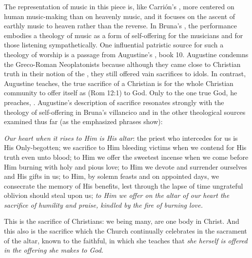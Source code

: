 The representation of music in this piece is, like Carrión's , more centered on human music-making than on heavenly music, and it focuses on the ascent of earthly music to heaven rather than the reverse.
In Bruna's , the performance embodies a theology of music as a form of self-offering for the musicians and for those listening sympathetically.
One influential patristic source for such a theology of worship is a passage from Augustine's , book 10.
Augustine condemns the Greco-Roman Neoplatonists because although they came close to Christian truth in their notion of the , they still offered vain sacrifices to idols.
In contrast, Augustine teaches, the true sacrifice of a Christian is for the whole Christian community to offer itself as  (Rom 12:1) to God.
Only to the one true God, he preaches, .%
	\autocite[10:3, p.~306]{Augustine:CityofGod}
Augustine's description of sacrifice resonates strongly with the theology of self-offering in Bruna's villancico and in the other theological sources examined thus far (as the emphasized phrases show):

\begin{quoting}
\emph{Our heart when it rises to Him is His altar}:
the priest who intercedes for us is His Only-begotten;
we sacrifice to Him bleeding victims when we contend for His truth even unto blood;
to Him we offer the sweetest incense when we come before Him burning with holy and pious love;
to Him we devote and surrender ourselves and His gifts in us;
to Him, by solemn feasts and on appointed days, we consecrate the memory of His benefits, lest through the lapse of time ungrateful oblivion should steal upon us;
\emph{to Him we offer on the altar of our heart the sacrifice of humility and praise, kindled by the fire of burning love.}%
	\autocite[10:3, p.~306]{Augustine:CityofGod}

This is the sacrifice of Christians: we being many, are one body in Christ.
And this also is the sacrifice which the Church continually celebrates in the sacrament of the altar, known to the faithful, in which she teaches that \emph{she herself is offered in the offering she makes to God}.%
	\autocite[10:6, p.~310]{Augustine:CityofGod}
\end{quoting}

